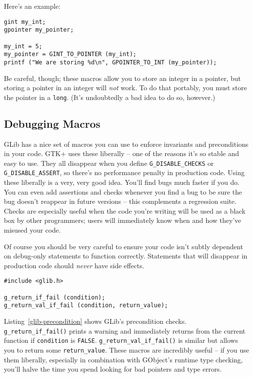 Here's an example:
\begin{lstlisting}
gint my_int;
gpointer my_pointer;

my_int = 5;
my_pointer = GINT_TO_POINTER (my_int);
printf ("We are storing %d\n", GPOINTER_TO_INT (my_pointer));
\end{lstlisting}

Be careful, though; these macros allow you to store an integer in a pointer, but storing a pointer in an integer will \emph{not} work. To do that portably, you must store the pointer in a \lstinline{long}. (It's undoubtedly a bad idea to do so, however.)

\subsection{Debugging Macros}

GLib has a nice set of macros you can use to enforce invariants and preconditions in your code. GTK+ uses these liberally -- one of the reasons it's so stable and easy to use. They all disappear when you define \lstinline{G_DISABLE_CHECKS} or \lstinline{G_DISABLE_ASSERT}, so there's no performance penalty in production code. Using these liberally is a very, very good idea. You'll find bugs much faster if you do. You can even add assertions and checks whenever you find a bug to be sure the bug doesn't reappear in future versions -- this complements a regression suite. Checks are especially useful when the code you're writing will be used as a black box by other programmers; users will immediately know when and how they've misused your code.

Of course you should be very careful to ensure your code isn't subtly dependent on debug-only statements to function correctly. Statements that will disappear in production code should \emph{never} have side effects.

\begin{lstlisting}[float, caption={Precondition Checks}, label=glib-precondition]
#include <glib.h>

g_return_if_fail (condition);
g_return_val_if_fail (condition, return_value);
\end{lstlisting}

Listing~\ref{glib-precondition} shows GLib's precondition checks. \lstinline{g_return_if_fail()} prints a warning and immediately returns from the current function if \lstinline{condition} is \lstinline{FALSE}. \lstinline{g_return_val_if_fail()} is similar but allows you to return some \lstinline{return_value}. These macros are incredibly useful -- if you use them liberally, especially in combination with GObject's runtime type checking, %
you'll halve the time you spend looking for bad pointers and type errors.

